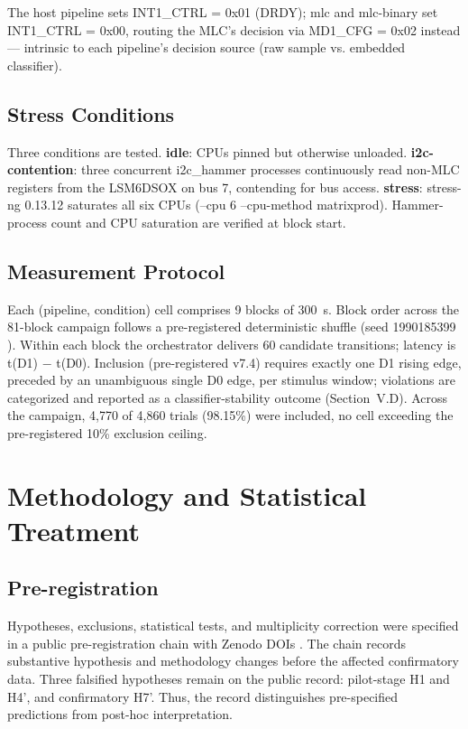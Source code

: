 The host pipeline sets INT1\_CTRL = 0x01 (DRDY); mlc and mlc-binary set INT1\_CTRL = 0x00, routing the MLC's decision via MD1\_CFG = 0x02 instead --- intrinsic to each pipeline's decision source (raw sample vs. embedded classifier).

\subsection{Stress Conditions}

Three conditions are tested. \textbf{idle}: CPUs pinned but otherwise unloaded. \textbf{i2c-contention}: three concurrent i2c\_hammer processes continuously read non-MLC registers from the LSM6DSOX on bus 7, contending for bus access. \textbf{stress}: stress-ng 0.13.12 saturates all six CPUs (--cpu 6 --cpu-method matrixprod). Hammer-process count and CPU saturation are verified at block start.

\subsection{Measurement Protocol}

Each (pipeline, condition) cell comprises 9 blocks of 300~s. Block order across the 81-block campaign follows a pre-registered deterministic shuffle (seed 1990185399 \cite{ref4}). Within each block the orchestrator delivers 60 candidate transitions; latency is t(D1) $-$ t(D0). Inclusion (pre-registered v7.4) requires exactly one D1 rising edge, preceded by an unambiguous single D0 edge, per stimulus window; violations are categorized and reported as a classifier-stability outcome (Section~V.D). Across the campaign, 4,770 of 4,860 trials (98.15\%) were included, no cell exceeding the pre-registered 10\% exclusion ceiling.


\section{Methodology and Statistical Treatment}

\subsection{Pre-registration}

Hypotheses, exclusions, statistical tests, and multiplicity correction were specified in a public pre-registration chain with Zenodo DOIs \cite{ref4}. The chain records substantive hypothesis and methodology changes before the affected confirmatory data. Three falsified hypotheses remain on the public record: pilot-stage H1 and H4', and confirmatory H7'. Thus, the record distinguishes pre-specified predictions from post-hoc interpretation.

